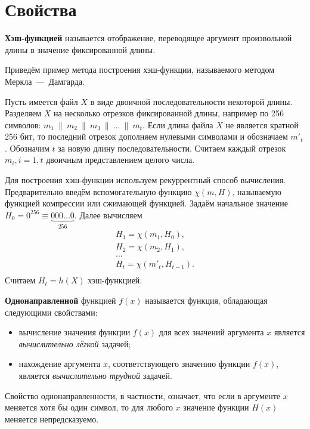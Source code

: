 \section{Свойства}

\textbf{Хэш-функцией} называется отображение, переводящее аргумент произвольной длины в значение фиксированной длины.

\example
Приведём пример метода построения хэш-функции, называемого методом Меркла~---~Дамгарда.~\cite{Merkle:1979, Merkle:1990, Damgard:1990}

Пусть имеется файл $X$ в виде двоичной последовательности некоторой длины. Разделяем $X$ на несколько отрезков фиксированной длины, например по 256 символов:  $m_{1} ~\|~ m_{2} ~\|~ m_{3} ~\|~ \ldots ~\|~ m_{t}$. Если длина файла $X$ не является кратной 256 бит, то последний отрезок дополняем нулевыми символами и обозначаем $m'_{t}$.
Обозначим $t$ за новую длину последовательности. Считаем каждый отрезок $m_i, i = \overline{1,t}$ двоичным представлением целого числа.

Для построения хэш-функции используем рекуррентный способ вычисления. Предварительно введём вспомогательную функцию $\chi(m, H)$, называемую функцией компрессии или сжимающей функцией. Задаём начальное значение $H_{0} = 0^{256} \equiv \underbrace{000 \ldots 0}_{256} $. Далее вычисляем
\[ \begin{array}{l}
    H_1 = \chi( m_1, H_0), \\
    H_2 = \chi( m_2, H_1), \\
    \dots \\
    H_t = \chi( m'_t, H_{t-1}). \\
\end{array} \]
Считаем $H_{t} = h(X)$ хэш-функцией.
\exampleend

\textbf{Однонаправленной} функцией $f(x)$ называется функция, обладающая следующими свойствами:
\begin{itemize}
    \item вычисление значения функции $f(x)$ для всех значений аргумента $x$ является \textit{вычислительно лёгкой} задачей;
    \item нахождение аргумента $x$, соответствующего значению функции $f(x)$, является \textit{вычислительно трудной} задачей.
\end{itemize}

Свойство однонаправленности, в частности, означает, что если в аргументе $x$ меняется хотя бы один символ, то для любого $x$ значение функции $H(x)$ меняется непредсказуемо.


